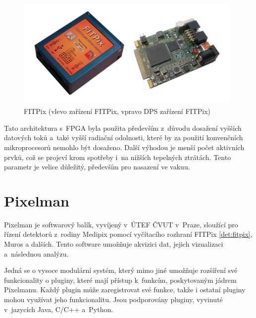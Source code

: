 \begin{figure}[th!]
	\begin{center}
		\includegraphics[width=11cm]{figures/fitpix.png}
		\caption{FITPix (vlevo zařízení FITPix, vpravo DPS zařízení FITPix)}
		\label{fig:det:fitpix}
	\end{center}
\end{figure}

Tato architektura s~FPGA byla použita především z~důvodu dosažení vyšších datových toků a~také vyšší radiační odolnosti, které by za použití konvenčních mikroprocesorů nemohlo být dosaženo. Další výhodou je menší počet aktivních prvků, což se projeví krom spotřeby i~na nižších tepelných ztrátách. Tento parametr je velice důležitý, především pro nasazení ve vakuu.

\section{Pixelman}\label{det:pixelman}
Pixelman \cite{pixelman} je softwarový balík, vyvíjený v~ÚTEF ČVUT v~Praze, sloužící pro řízení detektorů z~rodiny Medipix pomocí vyčítacího rozhraní FITPix \ref{det:fitpix}, Muros a dalších. Tento software umožňuje akvizici dat, jejich vizualizaci a~následnou analýzu.

Jedná se o vysoce modulární systém, který mimo jiné umožňuje rozšíření své funkcionality o pluginy, které mají přístup k~funkcím, poskytovaným jádrem Pixelmanu. Každý plugin může zaregistrovat své funkce, takže i ostatní pluginy mohou využívat jeho funkcionalitu. Jsou podporovány pluginy, vyvinuté v~jazycích Java, C/C++ a~Python. 





